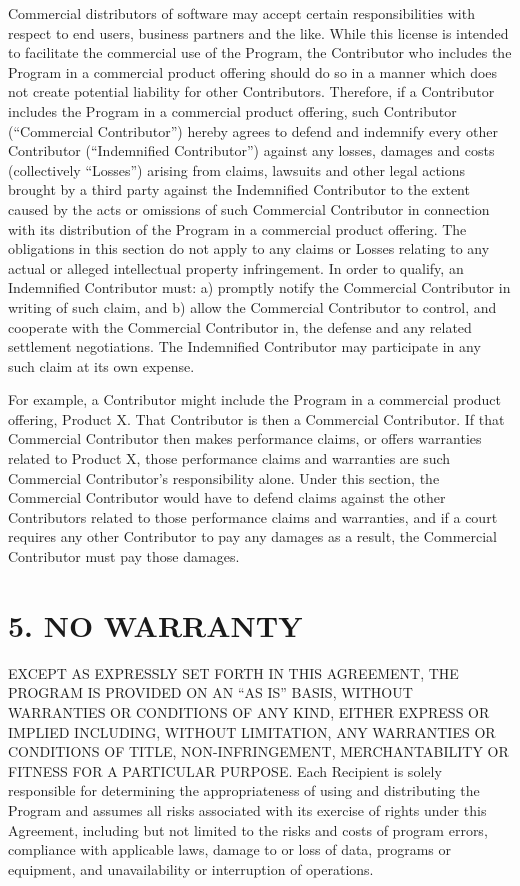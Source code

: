 Commercial distributors of software may accept certain responsibilities with 
respect to end users, business partners and the like. While this license is 
intended to facilitate the commercial use of the Program, the Contributor who 
includes the Program in a commercial product offering should do so in a manner 
which does not create potential liability for other Contributors. Therefore, if 
a Contributor includes the Program in a commercial product offering, such 
Contributor (\enquote{Commercial Contributor}) hereby agrees to defend and indemnify 
every other Contributor (\enquote{Indemnified Contributor}) against any losses, damages 
and costs (collectively \enquote{Losses}) arising from claims, lawsuits and other legal 
actions brought by a third party against the Indemnified Contributor to the 
extent caused by the acts or omissions of such Commercial Contributor in 
connection with its distribution of the Program in a commercial product 
offering. The obligations in this section do not apply to any claims or Losses 
relating to any actual or alleged intellectual property infringement. In order 
to qualify, an Indemnified Contributor must: a) promptly notify the Commercial 
Contributor in writing of such claim, and b) allow the Commercial Contributor 
to control, and cooperate with the Commercial Contributor in, the defense and 
any related settlement negotiations. The Indemnified Contributor may 
participate in any such claim at its own expense.

For example, a Contributor might include the Program in a commercial product 
offering, Product X. That Contributor is then a Commercial Contributor. If that 
Commercial Contributor then makes performance claims, or offers warranties 
related to Product X, those performance claims and warranties are such 
Commercial Contributor's responsibility alone. Under this section, the 
Commercial Contributor would have to defend claims against the other 
Contributors related to those performance claims and warranties, and if a court 
requires any other Contributor to pay any damages as a result, the Commercial 
Contributor must pay those damages.


\section*{5. NO WARRANTY}
\label{ref:appendix:license:five}

EXCEPT AS EXPRESSLY SET FORTH IN THIS AGREEMENT, THE PROGRAM IS PROVIDED ON AN 
\enquote{AS IS} BASIS, WITHOUT WARRANTIES OR CONDITIONS OF ANY KIND, EITHER EXPRESS OR 
IMPLIED INCLUDING, WITHOUT LIMITATION, ANY WARRANTIES OR CONDITIONS OF TITLE, 
NON-INFRINGEMENT, MERCHANTABILITY OR FITNESS FOR A PARTICULAR PURPOSE. Each 
Recipient is solely responsible for determining the appropriateness of using 
and distributing the Program and assumes all risks associated with its exercise 
of rights under this Agreement, including but not limited to the risks and 
costs of program errors, compliance with applicable laws, damage to or loss of 
data, programs or equipment, and unavailability or interruption of operations.


